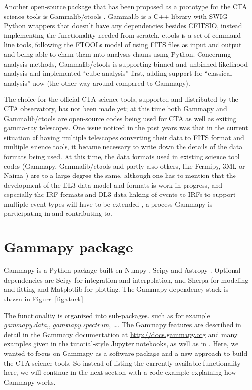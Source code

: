\documentclass{PoS}
\newcommand{\url}[1]{\href{#1}{#1}}
\begin{document}
Another open-source package that has been proposed as a prototype for the CTA
science tools is Gammalib/ctools \cite{ctools}. Gammalib is a C++ library with
SWIG Python wrappers that doesn't have any dependencies besides CFITSIO, instead
implementing the functionality needed from scratch. ctools is a set of command
line tools, following the FTOOLs model of using FITS files as input and output
and being able to chain them into analysis chains using Python. Concerning
analysis methods, Gammalib/ctools is supporting binned and unbinned likelihood
analysis and implemented ``cube analysis'' first, adding support for ``classical
analysis'' now (the other way around compared to Gammapy).

The choice for the official CTA science tools, supported and distributed by the
CTA observatory, has not been made yet; at this time both Gammapy and
Gammalib/ctools are open-source codes being used for CTA as well as exiting
gamma-ray telescopes. One issue noticed in the past years was that in the
current situation of having multiple telescopes converting their data to FITS
format and multiple science tools, it became necessary to write down the details
of the data formats being used. At this time, the data formats used in existing
science tool codes (Gammapy, Gammalib/ctools and partly also others, like
Fermipy, 3ML \cite{3ml} or Naima \cite{naima}) are to a large degree the same,
although one has to mention that the development of the DL3 data model and
formats is work in progress, and especially the IRF formats and DL3 data linking
of events to IRFs to support multiple event types will have to be extended
\cite{opendata}, a process Gammapy is participating in and contributing to.

\section{Gammapy package}
\label{sec:gammapy}

Gammapy is a Python package built on Numpy \cite{numpy}, Scipy \cite{scipy} and
Astropy \cite{astropy}. Optional dependencies are Scipy for integration and
interpolation, and Sherpa \cite{sherpa2001, sherpa2009, sherpa2011} for modeling
and fitting and Matplotlib \cite{matplotlib} for plotting. The Gammapy
dependency stack is shown in Figure~\ref{fig:stack}.

The functionality is organized into sub-packages, such as for example {\it
gammapy.data},, {\it gammapy.spectrum}, \ldots .
The Gammapy features are described in detail in the Gamma\-py documentation at
\url{http://docs.gammapy.org} and many examples given in the tutorial-style
Jupyter notebooks, as well as in \cite{gammapy-icrc2015}. Here, we wanted to
focus on Gammapy as a software package and a new approach to build the CTA
science tools. So instead of listing the currently available functionality here,
we will continue in the next section with a code example explaining how Gammapy
works.
\end{document}
